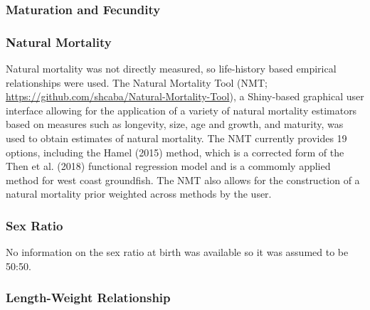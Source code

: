 \documentclass[11pt,
  english,
  a4paper,
]{article}
\begin{document}
\hypertarget{maturation-and-fecundity}{%
\subsubsection{Maturation and Fecundity}\label{maturation-and-fecundity}}

\leavevmode\tagmcend\tagstructend


\hypertarget{natural-mortality}{%
\subsubsection{Natural Mortality}\label{natural-mortality}}

\leavevmode\tagmcend\tagstructend

Natural mortality was not directly measured, so life-history based empirical relationships were used. The Natural Mortality Tool (NMT; {\url{https://github.com/shcaba/Natural-Mortality-Tool}\leavevmode\tagmcend\tagstructend}), a Shiny-based graphical user interface allowing for the application of a variety of natural mortality estimators based on measures such as longevity, size, age and growth, and maturity, was used to obtain estimates of natural mortality. The NMT currently provides 19 options, including the Hamel {(2015)\leavevmode\tagmcend\tagstructend} method, which is a corrected form of the Then et al. {(2018)\leavevmode\tagmcend\tagstructend} functional regression model and is a commomly applied method for west coast groundfish. The NMT also allows for the construction of a natural mortality prior weighted across methods by the user.


\hypertarget{sex-ratio}{%
\subsubsection{Sex Ratio}\label{sex-ratio}}

\leavevmode\tagmcend\tagstructend

No information on the sex ratio at birth was available so it was assumed to be 50:50.


\hypertarget{length-weight-relationship}{%
\subsubsection{Length-Weight Relationship}\label{length-weight-relationship}}
\end{document}
